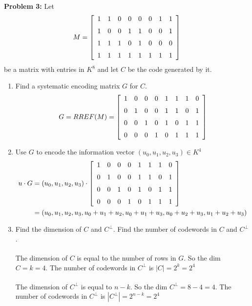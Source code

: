 \documentclass[11pt]{article}
\newenvironment{problem}[1]{\textbf{Problem #1: }}{\newpage}
\begin{document}
	\begin{problem}{3}
		Let
		\[M =  \left[ \begin {array}{cccccccc} 1&1&0&0&0&0&1&1\\ \noalign{\medskip}1
		&0&0&1&1&0&0&1\\ \noalign{\medskip}1&1&1&0&1&0&0&0
		\\ \noalign{\medskip}1&1&1&1&1&1&1&1\end {array} \right] 
		\]
		be a matrix with entries in $K^8$ and let $C$ be the code generated by it.
		\begin{enumerate}[label = (\alph*)]
			\item Find a systematic encoding matrix $G$ for $C$.
			\[G = RREF(M) =  \left[ \begin {array}{cccccccc} 1&0&0&0&1&1&1&0\\ \noalign{\medskip}0
			&1&0&0&1&1&0&1\\ \noalign{\medskip}0&0&1&0&1&0&1&1
			\\ \noalign{\medskip}0&0&0&1&0&1&1&1\end {array} \right] \]
			\item Use $G$ to encode the information vector $(u_0, u_1, u_2, u_3) \in K^4$ 
			\begin{align*} 
			u \cdot G &= (u_0, u_1, u_2, u_3) \cdot  \left[ \begin {array}{cccccccc} 1&0&0&0&1&1&1&0\\ \noalign{\medskip}0
			&1&0&0&1&1&0&1\\ \noalign{\medskip}0&0&1&0&1&0&1&1
			\\ \noalign{\medskip}0&0&0&1&0&1&1&1\end {array} \right] \\
			&= (u_0, u_1, u_2 ,u_3, u_0 + u_1 + u_2, u_0 + u_1 + u_3, u_0 + u_2 + u_3, u_1 + u_2 + u_3)
			\end{align*}
			\item  Find the dimension of $C$ and $C^\perp$. Find the number of codewords in $C$ and $C^\perp$.
			\\ \\
			The dimension of $C$ is equal to the number of rows in $G$. So the dim $C = k = 4$. The number of codewords in $C^\perp$ is $|C| = 2^k = 2^4$ 
			\\ \\
			The dimension of $C^\perp$ is equal to $n - k$. So the dim $C^\perp = 8 - 4 = 4$. The number of codewords in $C^\perp$ is $|C^\perp| = 2^{n-k} = 2^4$
			\\ \\

\end{enumerate}
\end{problem}
\end{document}
